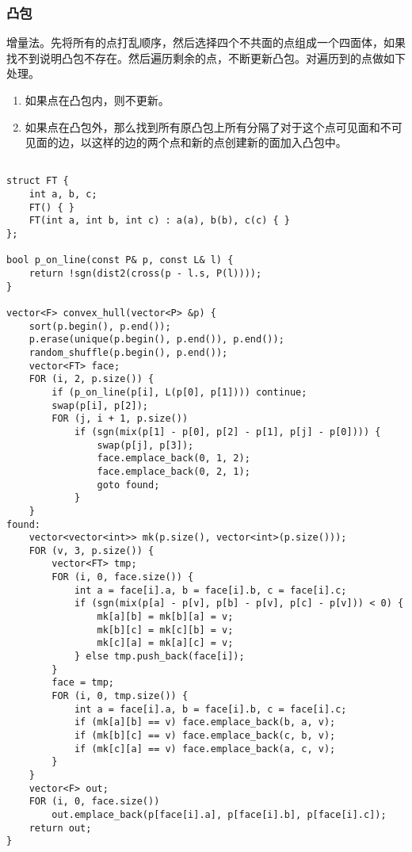 \documentclass[]{article}
\providecommand{\tightlist}{%
  \setlength{\itemsep}{0pt}\setlength{\parskip}{0pt}}
\begin{document}
\hypertarget{ux51f8ux5305}{%
\subsubsection{凸包}\label{ux51f8ux5305}}

增量法。先将所有的点打乱顺序，然后选择四个不共面的点组成一个四面体，如果找不到说明凸包不存在。然后遍历剩余的点，不断更新凸包。对遍历到的点做如下处理。

\begin{enumerate}
\def\labelenumi{\arabic{enumi}.}
\tightlist
\item
  如果点在凸包内，则不更新。
\item
  如果点在凸包外，那么找到所有原凸包上所有分隔了对于这个点可见面和不可见面的边，以这样的边的两个点和新的点创建新的面加入凸包中。
\end{enumerate}

\begin{verbatim}

struct FT {
    int a, b, c;
    FT() { }
    FT(int a, int b, int c) : a(a), b(b), c(c) { }
};

bool p_on_line(const P& p, const L& l) {
    return !sgn(dist2(cross(p - l.s, P(l))));
}

vector<F> convex_hull(vector<P> &p) {
    sort(p.begin(), p.end());
    p.erase(unique(p.begin(), p.end()), p.end());
    random_shuffle(p.begin(), p.end());
    vector<FT> face;
    FOR (i, 2, p.size()) {
        if (p_on_line(p[i], L(p[0], p[1]))) continue;
        swap(p[i], p[2]);
        FOR (j, i + 1, p.size())
            if (sgn(mix(p[1] - p[0], p[2] - p[1], p[j] - p[0]))) {
                swap(p[j], p[3]);
                face.emplace_back(0, 1, 2);
                face.emplace_back(0, 2, 1);
                goto found;
            }
    }
found:
    vector<vector<int>> mk(p.size(), vector<int>(p.size()));
    FOR (v, 3, p.size()) {
        vector<FT> tmp;
        FOR (i, 0, face.size()) {
            int a = face[i].a, b = face[i].b, c = face[i].c;
            if (sgn(mix(p[a] - p[v], p[b] - p[v], p[c] - p[v])) < 0) {
                mk[a][b] = mk[b][a] = v;
                mk[b][c] = mk[c][b] = v;
                mk[c][a] = mk[a][c] = v;
            } else tmp.push_back(face[i]);
        }
        face = tmp;
        FOR (i, 0, tmp.size()) {
            int a = face[i].a, b = face[i].b, c = face[i].c;
            if (mk[a][b] == v) face.emplace_back(b, a, v);
            if (mk[b][c] == v) face.emplace_back(c, b, v);
            if (mk[c][a] == v) face.emplace_back(a, c, v);
        }
    }
    vector<F> out;
    FOR (i, 0, face.size())
        out.emplace_back(p[face[i].a], p[face[i].b], p[face[i].c]);
    return out;
}
\end{verbatim}
\end{document}
